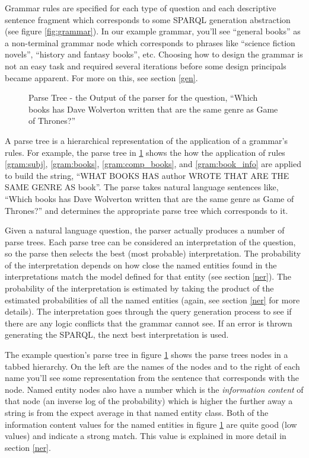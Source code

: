 \documentclass[11pt]{article}
\begin{document}
{Grammar rules are specified for each type of question and each descriptive sentence
fragment which corresponds to some SPARQL generation abstraction (see 
figure \ref{fig:grammar}). In our example grammar, you'll see ``general books'' as a
non-terminal grammar node which corresponds to phrases like ``science fiction novels'',
``history and fantasy books'', etc. Choosing how to design the grammar is not an
easy task and required several iterations before some design principals became apparent.
For more on this, see section \ref{gen}. 

\begin{figure}[h!]
\caption{Parse Tree - the Output of the parser for the question, 
``Which books has Dave Wolverton written that are the same genre as Game of Thrones?''}
\label{fig:parse}
\end{figure}

A parse tree is a hierarchical representation of the application of a grammar's rules.
For example, the parse tree in \ref{fig:parse} shows the how the application of rules
\ref{gram:subj}, \ref{gram:books}, \ref{gram:comp_books}, and \ref{gram:book_info}
are applied to build the string, 
``WHAT BOOKS HAS author WROTE THAT ARE THE SAME GENRE AS book''. The parse takes
natural language sentences like, ``Which books has Dave Wolverton written that
are the same genre as Game of Thrones?'' and determines the appropriate parse tree which
corresponds to it.

Given a natural language question, the parser actually produces a number of
parse trees. Each parse tree can be considered an interpretation of the question,
so the parse then selects the best (most probable) interpretation. The probability
of the interpretation depends on how close the named entities found in 
the interpretations match the model defined for that entity (see section \ref{ner}). 
The probability of the interpretation is estimated by taking the product of the 
estimated probabilities of all the named entities (again, see section \ref{ner} for
more details). The interpretation goes through the query generation process to see if 
there are any logic conflicts that the grammar cannot see. If an error is thrown generating the
SPARQL, the next best interpretation is used.

The example question's parse tree in figure \ref{fig:parse} shows the parse trees nodes
in a tabbed hierarchy. On the left are the names of the nodes and to
the right of each name you'll see some representation from the sentence that 
corresponds with the node. Named entity nodes also have a number which is the
{\em information content} of that node (an inverse log of the probability) which is higher
the further away a string is from the expect average in that named entity class. Both
of the information content values for the named entities in figure \ref{fig:parse} are
quite good (low values) and indicate a strong match. This value is explained in more detail in section \ref{ner}.

}
\end{document}
